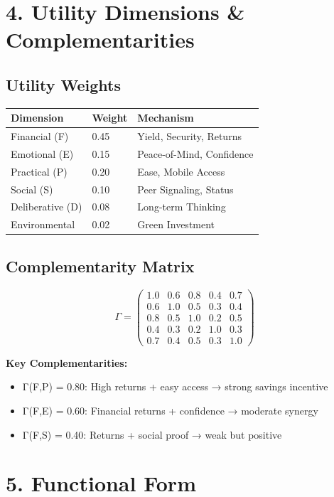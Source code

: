 \documentclass[11pt,a4paper]{article}
\begin{document}
\section{4. Utility Dimensions \& Complementarities}

\subsection{Utility Weights}

\begin{tabular}{lll}
\toprule
Dimension & Weight & Mechanism \\
\midrule
Financial (F) & 0.45 & Yield, Security, Returns \\
Emotional (E) & 0.15 & Peace-of-Mind, Confidence \\
Practical (P) & 0.20 & Ease, Mobile Access \\
Social (S) & 0.10 & Peer Signaling, Status \\
Deliberative (D) & 0.08 & Long-term Thinking \\
Environmental & 0.02 & Green Investment \\
\bottomrule
\end{tabular}

\subsection{Complementarity Matrix}

\[
\Gamma = \begin{pmatrix}
1.0 & 0.6 & 0.8 & 0.4 & 0.7 \\
0.6 & 1.0 & 0.5 & 0.3 & 0.4 \\
0.8 & 0.5 & 1.0 & 0.2 & 0.5 \\
0.4 & 0.3 & 0.2 & 1.0 & 0.3 \\
0.7 & 0.4 & 0.5 & 0.3 & 1.0
\end{pmatrix}
\]

\textbf{Key Complementarities:}
\begin{itemize}
\item Γ(F,P) = 0.80: High returns + easy access → strong savings incentive
\item Γ(F,E) = 0.60: Financial returns + confidence → moderate synergy
\item Γ(F,S) = 0.40: Returns + social proof → weak but positive
\end{itemize}

\section{5. Functional Form}
\end{document}
